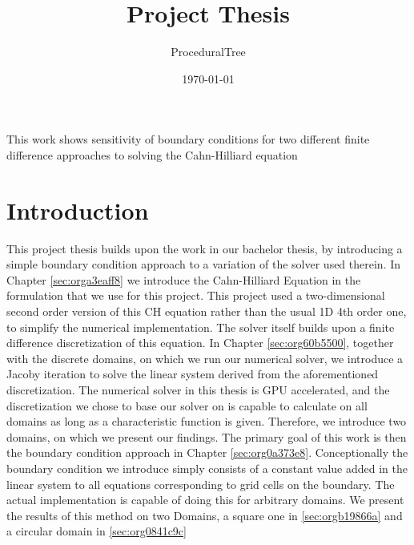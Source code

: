 \documentclass{mimosis}
\author{ProceduralTree}
\date{\today}
\title{Project Thesis}
\newenvironment{abstract} {}{}
\begin{document}
\maketitle
\setcounter{tocdepth}{1}
\tableofcontents

\begin{abstract}
This work shows sensitivity of boundary conditions for two different finite difference approaches to solving the Cahn-Hilliard equation
\end{abstract}
\chapter{Introduction}
\label{sec:org86eb858}
This project thesis builds upon the work in our bachelor thesis, by introducing a simple boundary condition approach to a variation of the solver used therein. In Chapter \ref{sec:orga3eaff8} we introduce the Cahn-Hilliard Equation in the formulation that we use for this project. This project used a two-dimensional second order version of this CH equation rather than the usual 1D 4th order one, to simplify the numerical implementation. The solver itself builds upon a finite difference discretization of this equation. In Chapter \ref{sec:org60b5500}, together with the discrete domains, on which we run our numerical solver, we introduce a Jacoby iteration to solve the linear system derived from the aforementioned discretization.  The numerical solver in this thesis is GPU accelerated, and the discretization we chose to base our solver on is capable to calculate on all domains as long as a characteristic function is given. Therefore, we introduce two domains, on which we present our findings. The primary goal of this work is then the boundary condition approach in Chapter \ref{sec:org0a373e8}. Conceptionally the boundary condition we introduce simply consists of a constant value added in the linear system to all equations corresponding to grid cells on the boundary. The actual implementation is capable of doing this for arbitrary domains. We present the results of this method on two Domains, a square one in \ref{sec:orgb19866a} and a circular domain in \ref{sec:org0841c9c}
\end{document}
